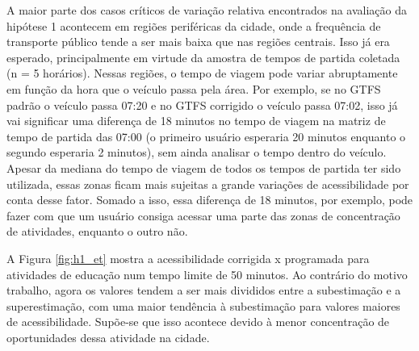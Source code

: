 \documentclass[        
    a4paper,          %
    12pt,             %
    chapter=TITLE,    %
    section=Title,    %
    subsection=Title, %
    oneside,          %
    english,          %
    spanish,          %
    brazil,           %
    fleqn             %
]{abntex2}
\begin{document}
  \begin{figure}[!h]
  \captionsetup{width=16cm}
  \centering
  \end{figure}
  
  A maior parte dos casos críticos de variação relativa encontrados na avaliação da hipótese 1 acontecem em regiões periféricas da cidade, onde a frequência de transporte público tende a ser mais baixa que nas regiões centrais. Isso já era esperado, principalmente em virtude da amostra de tempos de partida coletada (n = 5 horários). Nessas regiões, o tempo de viagem pode variar abruptamente em função da hora que o veículo passa pela área. Por exemplo, se no GTFS padrão o veículo passa 07:20 e no GTFS corrigido o veículo passa 07:02, isso já vai significar uma diferença de 18 minutos no tempo de viagem na matriz de tempo de partida das 07:00 (o primeiro usuário esperaria 20 minutos enquanto o segundo esperaria 2 minutos), sem ainda analisar o tempo dentro do veículo. Apesar da mediana do tempo de viagem de todos os tempos de partida ter sido utilizada, essas zonas ficam mais sujeitas a grande variações de acessibilidade por conta desse fator. Somado a isso, essa diferença de 18 minutos, por exemplo, pode fazer com que um usuário consiga acessar uma parte das zonas de concentração de atividades, enquanto o outro não.
  
  A Figura \ref{fig:h1_et} mostra a acessibilidade corrigida x programada para atividades de educação num tempo limite de 50 minutos. Ao contrário do motivo trabalho, agora os valores tendem a ser mais divididos entre a subestimação e a superestimação, com uma maior tendência à subestimação para valores maiores de acessibilidade. Supõe-se que isso acontece devido à menor concentração de oportunidades dessa atividade na cidade.
  
\end{document}
